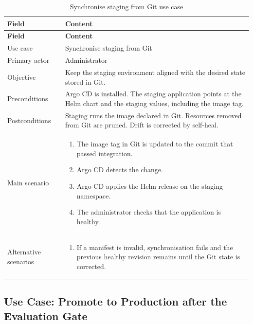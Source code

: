 \begingroup
\footnotesize
\renewcommand{\arraystretch}{1.15}
\begin{longtable}{|L{3.2cm}|L{11.6cm}|}
\caption{Synchronise staging from Git use case}
\label{tab:use-case-sync-staging} \\
\hline
{}
\textbf{Field} & \textbf{Content} \\
\hline
\endfirsthead
\hline
{}
\textbf{Field} & \textbf{Content} \\
\hline
\endhead
Use case & Synchronise staging from Git \\
\hline
Primary actor & Administrator \\
\hline
Objective & Keep the staging environment aligned with the desired state stored in Git. \\
\hline
Preconditions & Argo CD is installed. The staging application points at the Helm chart and the staging values, including the image tag. \\
\hline
Postconditions & Staging runs the image declared in Git. Resources removed from Git are pruned. Drift is corrected by self-heal. \\
\hline
Main scenario & \begin{enumerate}[leftmargin=1.5em,itemsep=0.1em,topsep=0.2em]
  \item The image tag in Git is updated to the commit that passed integration.
  \item Argo CD detects the change.
  \item Argo CD applies the Helm release on the staging namespace.
  \item The administrator checks that the application is healthy.
\end{enumerate} \\
\hline
Alternative scenarios & \begin{enumerate}[label=A\arabic*.,leftmargin=2em,itemsep=0.1em,topsep=0.2em]
  \item If a manifest is invalid, synchronisation fails and the previous healthy revision remains until the Git state is corrected.
\end{enumerate} \\
\hline
\end{longtable}
\endgroup

\subsection{Use Case: Promote to Production after the Evaluation Gate}

